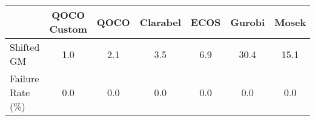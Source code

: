 \begin{tabular}{lcccccc}
  \hline
    & \textbf{QOCO Custom}   & \textbf{QOCO} & \textbf{Clarabel} & \textbf{ECOS} & \textbf{Gurobi} & \textbf{Mosek} \\ \hline
  Shifted GM & 1.0 & 2.1 & 3.5 & 6.9 & 30.4 & 15.1 \\ 
  Failure Rate (\%) & 0.0 & 0.0 & 0.0 & 0.0 & 0.0 & 0.0 \\ \hline 
\end{tabular}
